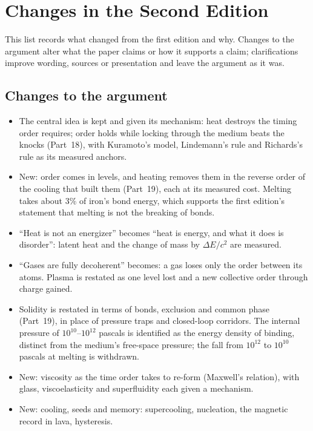 \documentclass[11pt,a4paper]{article}
\begin{document}
\clearpage
\section*{Changes in the Second Edition}

This list records what changed from the first edition and why. Changes to the argument alter what the paper claims or how it supports a claim; clarifications improve wording, sources or presentation and leave the argument as it was.

\subsection*{Changes to the argument}
\begin{itemize}
\item The central idea is kept and given its mechanism: heat destroys the timing order requires; order holds while locking through the medium beats the knocks (Part~18), with Kuramoto's model, Lindemann's rule and Richards's rule as its measured anchors.
\item New: order comes in levels, and heating removes them in the reverse order of the cooling that built them (Part~19), each at its measured cost. Melting takes about 3\% of iron's bond energy, which supports the first edition's statement that melting is not the breaking of bonds.
\item ``Heat is not an energizer'' becomes ``heat is energy, and what it does is disorder'': latent heat and the change of mass by $\Delta E/c^2$ are measured.
\item ``Gases are fully decoherent'' becomes: a gas loses only the order between its atoms. Plasma is restated as one level lost and a new collective order through charge gained.
\item Solidity is restated in terms of bonds, exclusion and common phase (Part~19), in place of pressure traps and closed-loop corridors. The internal pressure of $10^{10}$--$10^{12}$ pascals is identified as the energy density of binding, distinct from the medium's free-space pressure; the fall from $10^{12}$ to $10^{10}$ pascals at melting is withdrawn.
\item New: viscosity as the time order takes to re-form (Maxwell's relation), with glass, viscoelasticity and superfluidity each given a mechanism.
\item New: cooling, seeds and memory: supercooling, nucleation, the magnetic record in lava, hysteresis.

\end{itemize}
\end{document}
